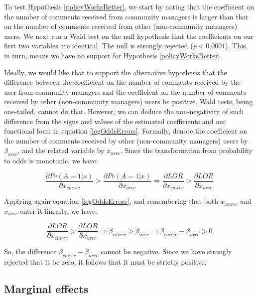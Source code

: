 To test Hypothesis \ref{policyWorksBetter}, we start by noting that the coefficient on the number of comments received from community managers is larger than that on the number of comments received from other (non-community managers) users. We next run a Wald test on the null hypothesis that the coefficients on our first two variables are identical. The null is strongly rejected ($p < 0.0001$). This, in turn, means we have no support for Hypothesis \ref{policyWorksBetter}. 

Ideally, we would like that to support the alternative hypothesis that the difference between the coefficient on the number of comments received by the user from community managers and the coefficient on the number of comments received by other (non-community managers) users be positive. Wald tests, being one-tailed, cannot do that. However, we can deduce the non-negativity of such difference from the signs and values of the estimated coefficients and our functional form in equation \ref{logOddsErrors}. Formally, denote the  coefficient on the number of comments received by other (non-community managers) users by $\beta_{urec}$, and the related variable by $x_{urec}$. Since the transformation from probability to odds is monotonic, we have:

\begin{equation}
	\frac{\partial Pr(A=1|x)}{\partial x_{cmrec}} > \frac{\partial Pr(A=1|x)}{\partial x_{urec}}  \Rightarrow \frac{\partial LOR}{\partial x_{cmrec}} > \frac{\partial LOR}{\partial x_{urec}} 
\end{equation}

Applying again equation \ref{logOddsErrors}, and remembering that both $x_{cmrec}$ and $x_{urec}$ enter it linearly, we have:

\begin{equation}
	\frac{\partial LOR}{\partial x_{cmrec}} > \frac{\partial LOR}{\partial x_{urec}}\Rightarrow \beta_{cmrec} > \beta_{urec} \Rightarrow \beta_{cmrec} - \beta_{urec} > 0
	\label{eq:condition4WaldTest}
\end{equation}

So, the difference $\beta_{cmrec} - \beta_{urec}$ cannot be negative. Since we have strongly rejected that it be zero, it follows that it must be strictly positive. 

\subsection{Marginal effects}

